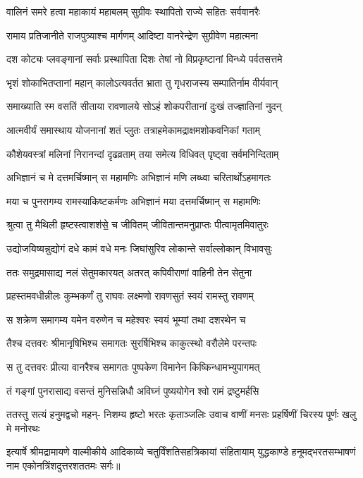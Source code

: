 \twolineshloka
{वालिनं समरे हत्वा महाकायं महाबलम्}
{सुग्रीवः स्थापितो राज्ये सहितः सर्ववानरैः}

\twolineshloka
{रामाय प्रतिजानीते राजपुत्र्याश्च मार्गणम्}
{आदिष्टा वानरेन्द्रेण सुग्रीवेण महात्मना}

\twolineshloka
{दश कोट्यः प्लवङ्गानां सर्वाः प्रस्थापिता दिशः}
{तेषां नो विप्रकृष्टानां विन्ध्ये पर्वतसत्तमे}

\twolineshloka
{भृशं शोकाभितप्तानां महान् कालोऽत्यवर्तत}
{भ्राता तु गृधराजस्य सम्पातिर्नाम वीर्यवान्}

\twolineshloka
{समाख्याति स्म वसतिं सीताया रावणालये}
{सोऽहं शोकपरीतानां दुःखं तज्ज्ञातिनां नुदन्}

\twolineshloka
{आत्मवीर्यं समास्थाय योजनानां शतं प्लुतः}
{तत्राहमेकामद्राक्षमशोकवनिकां गताम्}

\twolineshloka
{कौशेयवस्त्रां मलिनां निरानन्दां दृढव्रताम्}
{तया समेत्य विधिवत् पृष्ट्वा सर्वमनिन्दिताम्}

\twolineshloka
{अभिज्ञानं च मे दत्तमर्चिष्मान् स महामणिः}
{अभिज्ञानं मणि लब्ध्वा चरितार्थोऽहमागतः}

\twolineshloka
{मया च पुनरागम्य रामस्याकिष्टकर्मणः}
{अभिज्ञानं मया दत्तमर्चिष्मान् स महामणिः}

\twolineshloka
{श्रुत्वा तु मैथिली हृष्टस्त्वाशश॑से॒ च जीवितम्}
{जीवितान्तमनुप्राप्तः पीत्वामृतमिवातुरः}

\twolineshloka
{उद्योजयिष्यन्नुद्योगं दधे कामं वधे मनः}
{जिघांसुरिव लोकान्ते सर्वाल्लोकान् विभावसुः}

\twolineshloka
{ततः समुद्रमासाद्य नलं सेतुमकारयत्}
{अतरत् कपिवीराणां वाहिनी तेन सेतुना}

\twolineshloka
{प्रहस्तमवधीन्नीलः कुम्भकर्णं तु राघवः}
{लक्ष्मणो रावणसुतं स्वयं रामस्तु रावणम्}

\twolineshloka
{स शक्रेण समागम्य यमेन वरुणेन च}
{महेश्वरः स्वयं भूम्यां तथा दशरथेन च}

\twolineshloka
{तैश्च दत्तवरः श्रीमानृषिभिश्च समागतः}
{सुरर्षिभिश्च काकुत्स्थो वरौलेमे परन्तपः}

\twolineshloka
{स तु दत्तवरः प्रीत्या वानरैश्च समागतः}
{पुष्पकेण विमानेन किष्किन्धामभ्युपागमत्}

\twolineshloka
{तं गङ्गां पुनरासाद्य वसन्तं मुनिसन्निधौ}
{अविघ्नं पुष्ययोगेन श्वो रामं द्रष्टुमर्हसि}

\fourlineindentedshloka
{ततस्तु सत्यं हनुमद्वचो महन्-}
{निशम्य हृष्टो भरतः कृताञ्जलिः}
{उवाच वाणीं मनसः प्रहर्षिणीं}
{चिरस्य पूर्णः खलु मे मनोरथः} 


इत्यार्षे श्रीमद्रामायणे वाल्मीकीये आदिकाव्ये चतुर्विंशतिसहत्रिकायां संहितायाम् युद्धकाण्डे हनूमद्भरतसम्भाषणं नाम एकोनत्रिंशदुत्तरशततमः सर्गः॥

\closesection